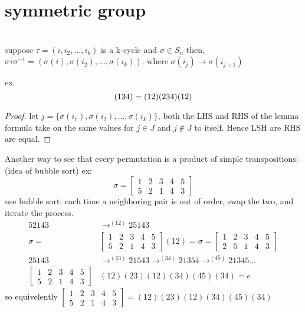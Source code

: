 \documentclass{article}
\begin{document}
\section{symmetric group}
\begin{lemma}[2.9.8] \leavevmode \\
    suppose $\tau = (i, i_2, \dots, i_k)$ is a k-cycle and $\sigma \in S_n$ then, $\sigma \tau \sigma^{-1} = (\sigma(i), \sigma(i_2), \dots, \sigma(i_k))$.
    where $\sigma(i_j) \rightarrow \sigma(i_{j+1})$
\end{lemma}
ex. $$(1 3 4) = (1 \space 2) (2 \space 3\space 4) (1\space2)$$
\begin{proof}
    let $j = \{\sigma(i_1), \sigma(i_2), \dots, \sigma(i_k)\}$, both the LHS and RHS of the lemma formula take on the same values for $j\in J$ and $j \notin J$ to itself. Hence LSH are RHS are equal. 
\end{proof}
Another way to see that every permutation is a product of simple transpositions: (idea of bubble sort)
ex: $$\sigma = \begin{bmatrix}
    1 & 2 & 3 & 4 & 5 \\
    5 & 2 & 1 & 4 & 3
\end{bmatrix}$$ 
use bubble sort: each time a neighboring pair is out of order, swap the two, and iterate the process. 
\begin{align*}
    52143 &\rightarrow^{(12)} 25143 \\ 
    \sigma = &\begin{bmatrix}
        1 & 2 & 3 & 4 & 5 \\
        5 & 2 & 1 & 4 & 3
    \end{bmatrix} (12) = \sigma = \begin{bmatrix}
        1 & 2 & 3 & 4 & 5 \\
        2 & 5 & 1 & 4 & 3
    \end{bmatrix} \\ 
    25143 &\rightarrow^{(23)} 21543  \rightarrow^ {(34)} 21354 \rightarrow^{(45)} 21345 \dots   \\ 
    \begin{bmatrix}
        1 & 2 & 3 & 4 & 5 \\
        5 & 2 & 1 & 4 & 3
    \end{bmatrix}&(12)(23)(12)(34)(45)(34) = e 
\end{align*}
so equivelently $\begin{bmatrix}
    1 & 2 & 3 & 4 & 5 \\
    5 & 2 & 1 & 4 & 3
\end{bmatrix} = (12)(23)(12)(34)(45)(34)$ \\
\end{document}
